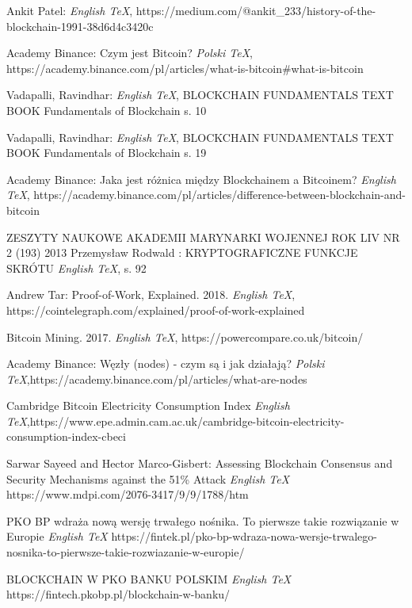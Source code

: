 \documentclass[a4paper,13pt]{report}
\begin{document}
\begin{thebibliography}{99}
 Ankit Patel:
\emph{English \TeX},
https://medium.com/@ankit\_233/history-of-the-blockchain-1991-38d6d4c3420c

 Academy Binance: Czym jest Bitcoin?
\emph{Polski \TeX},
https://academy.binance.com/pl/articles/what-is-bitcoin\#what-is-bitcoin

 Vadapalli, Ravindhar:
\emph{English \TeX},
BLOCKCHAIN FUNDAMENTALS TEXT BOOK Fundamentals of Blockchain s. 10

 Vadapalli, Ravindhar:
\emph{English \TeX},
BLOCKCHAIN FUNDAMENTALS TEXT BOOK Fundamentals of Blockchain s. 19

 Academy Binance: Jaka jest różnica między Blockchainem a Bitcoinem?
\emph{English \TeX},
https://academy.binance.com/pl/articles/difference-between-blockchain-and-bitcoin

 ZESZYTY NAUKOWE AKADEMII MARYNARKI WOJENNEJ
ROK LIV NR 2 (193) 2013  Przemysław Rodwald : KRYPTOGRAFICZNE FUNKCJE SKRÓTU
\emph{English \TeX},
 s. 92

 Andrew Tar: Proof-of-Work, Explained. 2018.
\emph{English \TeX},  https://cointelegraph.com/explained/proof-of-work-explained

 Bitcoin Mining. 2017. 
\emph{English \TeX}, https://powercompare.co.uk/bitcoin/

 Academy Binance: Węzły (nodes) - czym są i jak działają?
\emph{Polski \TeX},https://academy.binance.com/pl/articles/what-are-nodes

 Cambridge Bitcoin Electricity Consumption Index
\emph{English \TeX},https://www.epe.admin.cam.ac.uk/cambridge-bitcoin-electricity-consumption-index-cbeci

 Sarwar Sayeed and Hector Marco-Gisbert: Assessing Blockchain Consensus and Security Mechanisms against the 51\% Attack
\emph{English \TeX} https://www.mdpi.com/2076-3417/9/9/1788/htm

 PKO BP wdraża nową wersję trwałego nośnika. To pierwsze takie rozwiązanie w Europie
\emph{English \TeX} https://fintek.pl/pko-bp-wdraza-nowa-wersje-trwalego-nosnika-to-pierwsze-takie-rozwiazanie-w-europie/

BLOCKCHAIN W PKO BANKU POLSKIM
\emph{English \TeX} https://fintech.pkobp.pl/blockchain-w-banku/

\end{thebibliography}
\end{document}
